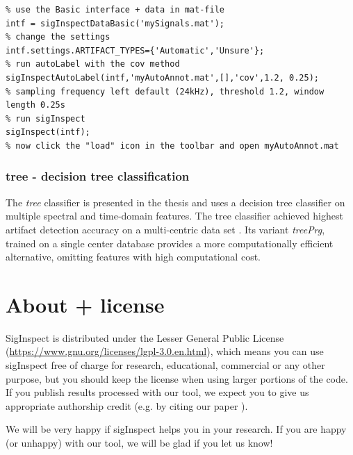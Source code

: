 \documentclass[a4paper,10pt]{article}
\begin{document}
\begin{lstlisting}
% use the Basic interface + data in mat-file
intf = sigInspectDataBasic('mySignals.mat');
% change the settings
intf.settings.ARTIFACT_TYPES={'Automatic','Unsure'};
% run autoLabel with the cov method
sigInspectAutoLabel(intf,'myAutoAnnot.mat',[],'cov',1.2, 0.25);
% sampling frequency left default (24kHz), threshold 1.2, window length 0.25s
% run sigInspect
sigInspect(intf);
% now click the "load" icon in the toolbar and open myAutoAnnot.mat
\end{lstlisting}

\subsubsection{tree - decision tree classification}
The \emph{tree} classifier is presented in the thesis \cite{Bakstein2016} and uses a decision tree classifier on multiple spectral and time-domain features. The tree classifier achieved highest artifact detection accuracy on a multi-centric data set \cite{Bakstein2016}. Its variant \emph{treePrg}, trained on a single center database provides a more computationally efficient alternative, omitting features with high computational cost.


\section{About + license}
SigInspect is distributed under the Lesser General Public License (\url{https://www.gnu.org/licenses/lgpl-3.0.en.html}), which means you can use sigInspect free of charge for research, educational, commercial or any other purpose, but you should keep the license when using larger portions of the code. If you publish results processed with our tool, we expect you to give us appropriate authorship credit (e.g. by citing our paper \cite{Bakstein2015}). 

We will be very happy if sigInspect helps you in your research. If you are happy (or unhappy) with our tool, we will be glad if you let us know!
\end{document}
